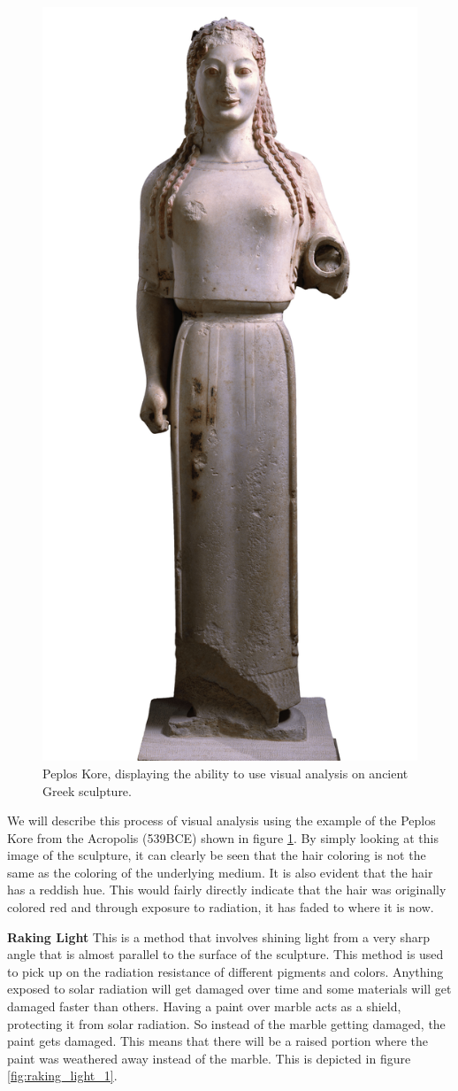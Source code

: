 \documentclass[10pt]{armath}
\begin{document}
\begin{figure}[htpb]
  \centering
  \includegraphics[width=0.4\linewidth]{visual_analysis.png}
  \caption{Peplos Kore, displaying the ability to use visual analysis on
  ancient Greek sculpture.}
  \label{fig:visual_analysis}
\end{figure}

We will describe this process of visual analysis using the example of the
Peplos Kore from the Acropolis (539BCE) shown in figure
\ref{fig:visual_analysis}\autocite{PKI}.  By simply looking at this image of
the sculpture, it can clearly be seen that the hair coloring is not the same as
the coloring of the underlying medium. It is also evident that the hair has a
reddish hue.  This would fairly directly indicate that the hair was originally
colored red and through exposure to radiation, it has faded to where it is now.

\textbf{Raking Light} This is a method that involves shining light from a very
sharp angle that is almost parallel to the surface of the sculpture. This
method is used to pick up on the radiation resistance of different pigments and
colors. Anything exposed to solar radiation will get damaged over time and some
materials will get damaged faster than others. Having a paint over marble acts
as a shield, protecting it from solar radiation. So instead of the marble
getting damaged, the paint gets damaged. This means that there will be a raised
portion where the paint was weathered away instead of the marble. This is
depicted in figure \ref{fig:raking_light_1}.
\end{document}
